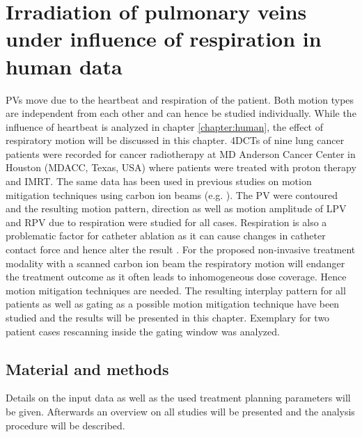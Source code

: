 
\chapter{Irradiation of pulmonary veins under influence of respiration in human data}
\label{chapter:mdacc}
\minitoc


PVs move due to the heartbeat and respiration of the patient. Both motion types are independent from each other and can hence be studied 
individually. While the influence of heartbeat is analyzed in chapter \ref{chapter:human}, the effect of respiratory motion will be discussed 
in this chapter. 4DCTs of nine lung cancer patients were recorded for cancer radiotherapy at MD Anderson Cancer Center in Houston (MDACC, 
Texas, USA) where patients were treated with proton therapy and IMRT. The same data has been used in previous studies on motion mitigation 
techniques using carbon ion beams (e.g. \cite{Lue12, Woe11}). The PV were contoured and the resulting motion pattern, direction as well as 
motion amplitude of LPV and RPV due to respiration were studied for all cases. Respiration is also a problematic factor for catheter ablation 
as it can cause changes in catheter contact force and hence alter the result \cite{Kum12}. For the proposed non-invasive treatment modality 
with a scanned carbon ion beam the respiratory motion will endanger the treatment outcome as it often leads to inhomogeneous dose coverage. Hence 
motion mitigation techniques are needed. The resulting interplay pattern for all patients as well as gating as a possible motion mitigation 
technique have been studied and the results will be presented in this chapter. Exemplary for two patient cases rescanning inside the gating 
window was analyzed. 

\section{Material and methods}
Details on the input data as well as the used treatment planning parameters will be given. Afterwards an overview on all 
studies will be presented and the analysis procedure will be described.  

\vspace*{-0.3cm}
